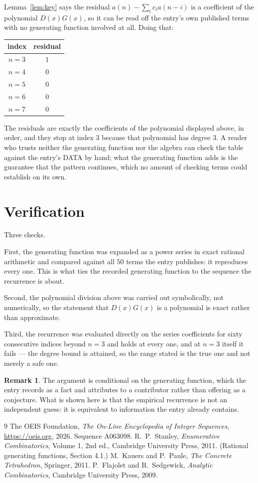 \documentclass[11pt,a4paper]{article}
\theoremstyle{plain}
\theoremstyle{definition}
\newtheorem{remark}[theorem]{Remark}
\begin{document}
Lemma~\ref{lem:key} says the residual $a(n)-\sum_ic_ia(n-i)$ is a coefficient of the
polynomial $D(x)G(x)$, so it can be read off the entry's own published terms with no
generating function involved at all. Doing that:
\begin{center}
\begin{tabular}{cc}
index & residual \\ \hline
$n=3$ & $1$ \\
$n=4$ & $0$ \\
$n=5$ & $0$ \\
$n=6$ & $0$ \\
$n=7$ & $0$
\end{tabular}
\end{center}
The residuals are exactly the coefficients of the polynomial displayed above, in order, and
they stop at index $3$ because that polynomial has degree $3$. A reader who trusts
neither the generating function nor the algebra can check the table against the entry's DATA
by hand; what the generating function adds is the guarantee that the pattern continues, which
no amount of checking terms could establish on its own.

\section{Verification}

Three checks.

First, the generating function was expanded as a power series in exact rational arithmetic and
compared against all $50$ terms the entry publishes: it reproduces every one. This is
what ties the recorded generating function to the sequence the recurrence is about.

Second, the polynomial division above was carried out symbolically, not numerically, so the
statement that $D(x)G(x)$ is a polynomial is exact rather than approximate.

Third, the recurrence was evaluated directly on the series coefficients for sixty consecutive
indices beyond $n=3$ and holds at every one, and at $n=3$ itself it fails --- the
degree bound is attained, so the range stated is the true one and not merely a safe one.

\begin{remark}
The argument is conditional on the generating function, which the entry records as a fact and
attributes to a contributor rather than offering as a conjecture. What is shown here is that
the empirical recurrence is not an independent guess: it is equivalent to information the
entry already contains.
\end{remark}

\begin{thebibliography}{9}
 The OEIS Foundation, \emph{The On-Line Encyclopedia of Integer
Sequences}, \url{https://oeis.org}, 2026. Sequence A063098.
 R.~P.~Stanley, \emph{Enumerative Combinatorics}, Volume 1, 2nd ed.,
Cambridge University Press, 2011. (Rational generating functions, Section 4.1.)
 M.~Kauers and P.~Paule, \emph{The Concrete Tetrahedron}, Springer, 2011.
 P.~Flajolet and R.~Sedgewick, \emph{Analytic Combinatorics}, Cambridge
University Press, 2009.
\end{thebibliography}
\end{document}
